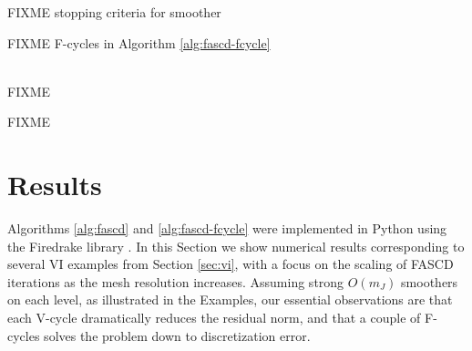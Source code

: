\documentclass[letterpaper,final,12pt,reqno]{amsart}
\theoremstyle{cstyle}
\theoremstyle{cstyle*}
\theoremstyle{dstyle}
\numberwithin{equation}{section}
\numberwithin{figure}{section}
\numberwithin{table}{section}
\numberwithin{theorem}{section}
\begin{document}

FIXME stopping criteria for smoother

FIXME F-cycles in Algorithm \ref{alg:fascd-fcycle}

\begin{pseudofloat}[ht]
\begin{pseudo}
 \\
FIXME
\end{pseudo}
\caption{FIXME}
\label{alg:fascd-fcycle}
\end{pseudofloat}


\section{Results} \label{sec:results}

Algorithms \ref{alg:fascd} and \ref{alg:fascd-fcycle} were implemented in Python using the Firedrake library \cite{Rathgeberetal2016}.  In this Section we show numerical results corresponding to several VI examples from Section \ref{sec:vi}, with a focus on the scaling of FASCD iterations as the mesh resolution increases.  Assuming strong $O(m_J)$ smoothers on each level, as illustrated in the Examples, our essential observations are that each V-cycle dramatically reduces the residual norm, and that a couple of F-cycles solves the problem down to discretization error.
\end{document}
